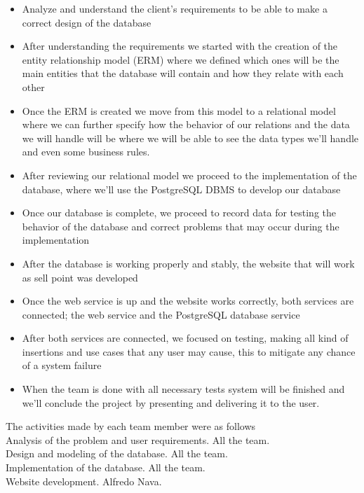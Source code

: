 \documentclass{article}
\begin{document}
\begin{itemize}
\item Analyze and understand the client’s requirements to be able to make a correct design of the database
\item After understanding the requirements we started with the creation of the entity relationship model (ERM) where we defined which ones will be the main entities that the database will contain and how they relate with each other
\item Once the ERM is created we move from this model to a relational model where we can further specify how the behavior of our relations and the data we will handle will be where we will be able to see the data types we’ll handle and even some business rules.
\item After reviewing our relational model we proceed to the implementation of the database, where we’ll use the PostgreSQL DBMS to develop our database 
\item Once our database is complete, we proceed to record data for testing the behavior of the database and correct problems that may occur during the implementation
\item After the database is working properly and stably, the website that will work as sell point was developed 
\item Once the web service is up and the website works correctly, both services are connected; the web service and the PostgreSQL database service
\item After both services are connected, we focused on testing, making all kind of insertions and use cases that any user may cause, this to mitigate any chance of a system failure
\item When the team is done with all necessary tests system will be finished and we’ll conclude the project by presenting and delivering it to the user. 
\end{itemize}

The activities made by each team member were as follows\\

Analysis of the problem and user requirements. \- All the team.\\

Design and modeling of the database. \- All the team.\\

Implementation of the database. \- All the team.\\

Website development. \- Alfredo Nava.\\
\end{document}
